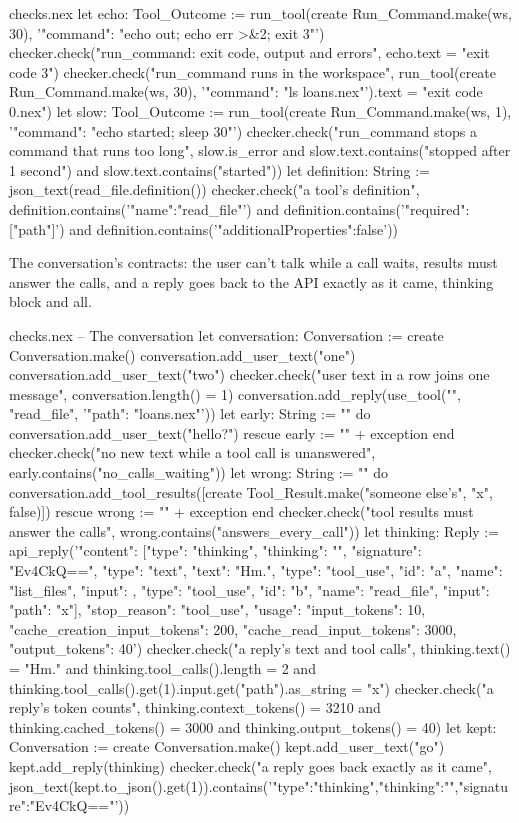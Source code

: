 \begin{continued}{checks.nex}
let echo: Tool_Outcome := run_tool(create Run_Command.make(ws, 30), '{"command": "echo out; echo err >&2; exit 3"}')
checker.check("run_command: exit code, output and errors", echo.text = "exit code 3\nout\nerr\n")
checker.check("run_command runs in the workspace",
  run_tool(create Run_Command.make(ws, 30), '{"command": "ls loans.nex"}').text = "exit code 0\nloans.nex\n")
let slow: Tool_Outcome := run_tool(create Run_Command.make(ws, 1), '{"command": "echo started; sleep 30"}')
checker.check("run_command stops a command that runs too long",
  slow.is_error and slow.text.contains("stopped after 1 second") and slow.text.contains("started"))
let definition: String := json_text(read_file.definition())
checker.check("a tool's definition", definition.contains('"name":"read_file"')
  and definition.contains('"required":["path"]') and definition.contains('"additionalProperties":false'))
\end{continued}

The conversation's contracts: the user can't talk while a call waits,
results must answer the calls, and a reply goes back to the API exactly as
it came, thinking block and all.

\begin{continued}{checks.nex}
-- The conversation
let conversation: Conversation := create Conversation.make()
conversation.add_user_text("one")
conversation.add_user_text("two")
checker.check("user text in a row joins one message", conversation.length() = 1)
conversation.add_reply(use_tool("", "read_file", '{"path": "loans.nex"}'))
let early: String := ""
do
  conversation.add_user_text("hello?")
rescue
  early := "" + exception
end
checker.check("no new text while a tool call is unanswered", early.contains("no_calls_waiting"))
let wrong: String := ""
do
  conversation.add_tool_results([create Tool_Result.make("someone else's", "x", false)])
rescue
  wrong := "" + exception
end
checker.check("tool results must answer the calls", wrong.contains("answers_every_call"))
let thinking: Reply := api_reply('{"content": [{"type": "thinking", "thinking": "", "signature": "Ev4CkQ=="}, {"type": "text", "text": "Hm."}, {"type": "tool_use", "id": "a", "name": "list_files", "input": {}}, {"type": "tool_use", "id": "b", "name": "read_file", "input": {"path": "x"}}], "stop_reason": "tool_use", "usage": {"input_tokens": 10, "cache_creation_input_tokens": 200, "cache_read_input_tokens": 3000, "output_tokens": 40}}')
checker.check("a reply's text and tool calls", thinking.text() = "Hm." and thinking.tool_calls().length = 2
  and thinking.tool_calls().get(1).input.get("path").as_string = "x")
checker.check("a reply's token counts", thinking.context_tokens() = 3210 and thinking.cached_tokens() = 3000
  and thinking.output_tokens() = 40)
let kept: Conversation := create Conversation.make()
kept.add_user_text("go")
kept.add_reply(thinking)
checker.check("a reply goes back exactly as it came",
  json_text(kept.to_json().get(1)).contains('{"type":"thinking","thinking":"","signature":"Ev4CkQ=="}'))
\end{continued}

